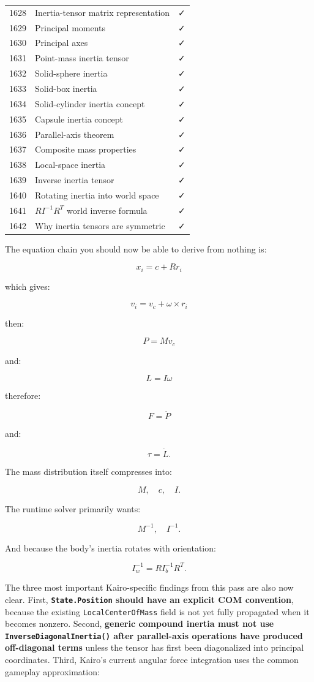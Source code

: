 {\begin{longtable}[]{@{}rll@{}}
1628 & Inertia-tensor matrix representation & ✓ \\
1629 & Principal moments & ✓ \\
1630 & Principal axes & ✓ \\
1631 & Point-mass inertia tensor & ✓ \\
1632 & Solid-sphere inertia & ✓ \\
1633 & Solid-box inertia & ✓ \\
1634 & Solid-cylinder inertia concept & ✓ \\
1635 & Capsule inertia concept & ✓ \\
1636 & Parallel-axis theorem & ✓ \\
1637 & Composite mass properties & ✓ \\
1638 & Local-space inertia & ✓ \\
1639 & Inverse inertia tensor & ✓ \\
1640 & Rotating inertia into world space & ✓ \\
1641 & \(RI^{-1}R^T\) world inverse formula & ✓ \\
1642 & Why inertia tensors are symmetric & ✓ \\
\end{longtable}
}

The equation chain you should now be able to derive from nothing is:

\[
\boxed{
x_i=c+Rr_i
}
\]

which gives:

\[
\boxed{
v_i=v_c+\omega\times r_i
}
\]

then:

\[
\boxed{
P=Mv_c
}
\]

and:

\[
\boxed{
L=I\omega
}
\]

therefore:

\[
\boxed{
F=\dot P
}
\]

and:

\[
\boxed{
\tau=\dot L.
}
\]

The mass distribution itself compresses into:

\[
\boxed{
M,\quad c,\quad I.
}
\]

The runtime solver primarily wants:

\[
\boxed{
M^{-1},\quad I^{-1}.
}
\]

And because the body's inertia rotates with orientation:

\[
\boxed{
I_w^{-1}
=
R I_b^{-1} R^T.
}
\]

The three most important Kairo-specific findings from this pass are also now clear. First, \textbf{\texttt{State.Position} should have an explicit COM convention}, because the existing \texttt{LocalCenterOfMass} field is not yet fully propagated when it becomes nonzero. Second, \textbf{generic compound inertia must not use \texttt{InverseDiagonalInertia()} after parallel-axis operations have produced off-diagonal terms} unless the tensor has first been diagonalized into principal coordinates. Third, Kairo's current angular force integration uses the common gameplay approximation:

